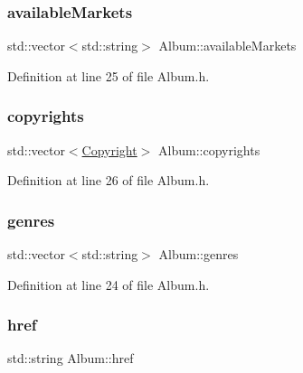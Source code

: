 \subsubsection{\texorpdfstring{available\+Markets}{availableMarkets}}
{\footnotesize\ttfamily std\+::vector$<$std\+::string$>$ Album\+::available\+Markets\hspace{0.3cm}{\ttfamily [private]}}



Definition at line 25 of file Album.\+h.

\mbox{\label{class_album_ace8d3c2e8ab7226fb7bdb5c15391b56a}} 
\subsubsection{\texorpdfstring{copyrights}{copyrights}}
{\footnotesize\ttfamily std\+::vector$<$\mbox{\hyperlink{class_copyright}{Copyright}}$>$ Album\+::copyrights\hspace{0.3cm}{\ttfamily [private]}}



Definition at line 26 of file Album.\+h.

\mbox{\label{class_album_ac98ad6106f66e02f6aef208f4f102453}} 
\subsubsection{\texorpdfstring{genres}{genres}}
{\footnotesize\ttfamily std\+::vector$<$std\+::string$>$ Album\+::genres\hspace{0.3cm}{\ttfamily [private]}}



Definition at line 24 of file Album.\+h.

\mbox{\label{class_album_a0bb0761ec3abcfe5e429e1cdec7569e4}} 
\subsubsection{\texorpdfstring{href}{href}}
{\footnotesize\ttfamily std\+::string Album\+::href\hspace{0.3cm}{\ttfamily [private]}}



